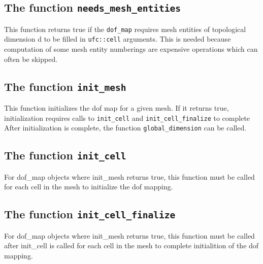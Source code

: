 
\subsection{The function \texttt{needs\_mesh\_entities}}
This function returns true if the \texttt{dof\_map} requires mesh entities
of topological dimension d to be filled in \texttt{ufc::cell} arguments.
This is needed because computation of some mesh entity numberings
are expensive operations which can often be skipped.


\subsection{The function \texttt{init\_mesh}}
This function initializes the dof map for a given mesh.
If it returns true, initialization requires calls to \texttt{init\_cell} and \texttt{init\_cell\_finalize} to complete
After initialization is complete, the function \texttt{global\_dimension} can be called.


\subsection{The function \texttt{init\_cell}}
For dof\_map objects where init\_mesh returns true,
this function must be called for each cell in the mesh
to initialize the dof mapping.


\subsection{The function \texttt{init\_cell\_finalize}}
For dof\_map objects where init\_mesh returns true,
this function must be called after init\_cell is called for each cell in the mesh
to complete initialition of the dof mapping.


